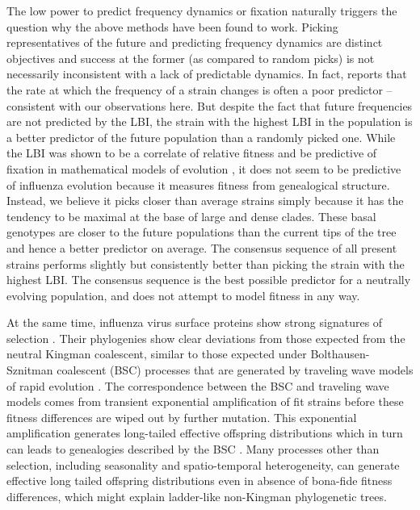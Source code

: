 \documentclass[reprint,amsmath,amssymb,superscriptaddress,showpacs,rmp]{revtex4-1}
\begin{document}
The low power to predict frequency dynamics or fixation naturally triggers the question why the above methods have been found to work.
Picking representatives of the future and predicting frequency dynamics are distinct objectives and success at the former (as compared to random picks) is not necessarily inconsistent with a lack of predictable dynamics.
In fact, \citep{huddleston_integrating_2020} reports that the rate at which the frequency of a strain changes is often a poor predictor -- consistent with our observations here.
But despite the fact that future frequencies are not predicted by the LBI, the strain with the highest LBI in the population is a better predictor of the future population than a randomly picked one.
While the LBI was shown to be a correlate of relative fitness and be predictive of fixation in mathematical models of evolution \citep{neher_predicting_2014}, it does not seem to be predictive of influenza evolution because it measures fitness from genealogical structure.
Instead, we believe it picks closer than average strains simply because it has the tendency to be maximal at the base of large and dense clades.
These basal genotypes are closer to the future populations than the current tips of the tree and hence a better predictor on average.
The consensus sequence of all present strains performs slightly but consistently better than picking the strain with the highest LBI.
The consensus sequence is the best possible predictor for a neutrally evolving population, and does not attempt to model fitness in any way.

At the same time, influenza virus surface proteins show strong signatures of selection \citep{bhatt_genomic_2011,strelkowa_clonal_2012}.
Their phylogenies show clear deviations from those expected from the neutral Kingman coalescent, similar to those expected under Bolthausen-Sznitman coalescent (BSC) processes that are generated by traveling wave models of rapid evolution \citep{neher_genealogies_2013,desai_genetic_2013}.
The correspondence between the BSC and traveling wave models comes from transient exponential amplification of fit strains before these fitness differences are wiped out by further mutation.
This exponential amplification generates long-tailed effective offspring distributions which in turn can leads to genealogies described by the BSC \citep{schweinsberg_coalescent_2003,neher_genealogies_2013}.
Many processes other than selection, including seasonality and spatio-temporal heterogeneity, can generate effective long tailed offspring distributions even in absence of bona-fide fitness differences, which might explain ladder-like non-Kingman phylogenetic trees.
\end{document}
